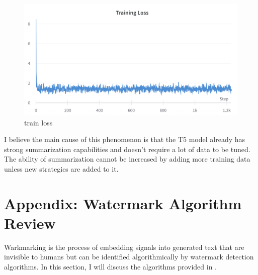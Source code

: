 \documentclass{article}
\begin{document}
\begin{figure}[H]
	\centering
	\includegraphics[width=1.0\linewidth]{images/train_loss}
	\caption{train loss}
	\label{fig:trainloss}
\end{figure}

I believe the main cause of this phenomenon is that the T5 model already has strong summarization capabilities and doesn't require a lot of data to be tuned. The ability of summarization cannot be increased by adding more training data unless new strategies are added to it.

\appendix
\section*{Appendix: Watermark Algorithm Review}
Warkmarking is the process of embedding signals into generated text that are invisible to humans but can be identified algorithmically by watermark detection algorithms.  In this section, I will discuss the algorithms provided in \cite{kirchenbauer2023watermark}.
\end{document}
